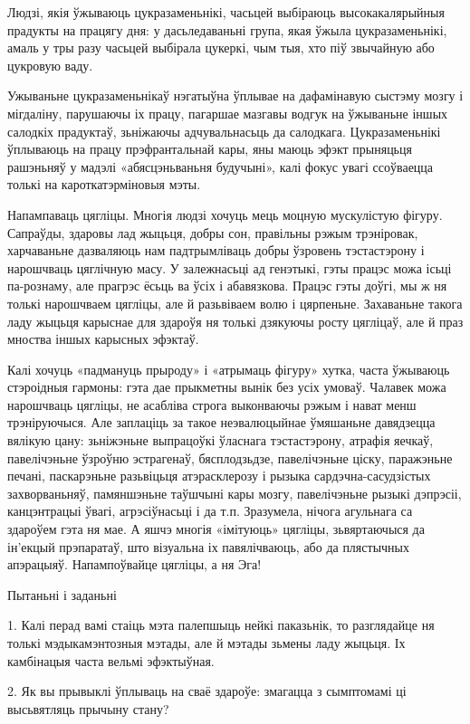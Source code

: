 Людзі, якія ўжываюць цукразаменьнікі, часьцей выбіраюць высокакалярыйныя прадукты на працягу дня: у дасьледаваньні група, якая ўжыла цукразаменьнікі, амаль у тры разу часьцей выбірала цукеркі, чым тыя, хто піў звычайную або цукровую ваду.

Ужываньне цукразаменьнікаў нэгатыўна ўплывае на дафамінавую сыстэму мозгу і мігдаліну, парушаючы іх працу, пагаршае мазгавы водгук на ўжываньне іншых салодкіх прадуктаў, зьніжаючы адчувальнасьць да салодкага. Цукразаменьнікі ўплываюць на працу прэфрантальнай кары, яны маюць эфэкт прыняцьця рашэньняў у мадэлі «абясцэньваньня будучыні», калі фокус увагі ссоўваецца толькі на кароткатэрміновыя мэты.

Напампаваць цягліцы. Многія людзі хочуць мець моцную мускулістую фігуру. Сапраўды, здаровы лад жыцьця, добры сон, правільны рэжым трэніровак, харчаваньне дазваляюць нам падтрымліваць добры ўзровень тэстастэрону і нарошчваць цяглічную масу. У залежнасьці ад генэтыкі, гэты працэс можа ісьці па-рознаму, але прагрэс ёсьць ва ўсіх і абавязкова. Працэс гэты доўгі, мы ж ня толькі нарошчваем цягліцы, але й разьвіваем волю і цярпеньне. Захаваньне такога ладу жыцьця карыснае для здароўя ня толькі дзякуючы росту цягліцаў, але й праз мноства іншых карысных эфэктаў.

Калі хочуць «падмануць прыроду» і «атрымаць фігуру» хутка, часта ўжываюць стэроідныя гармоны: гэта дае прыкметны вынік без усіх умоваў. Чалавек можа нарошчваць цягліцы, не асабліва строга выконваючы рэжым і нават менш трэніруючыся. Але заплаціць за такое неэвалюцыйнае ўмяшаньне давядзецца вялікую цану: зьніжэньне выпрацоўкі ўласнага тэстастэрону, атрафія яечкаў, павелічэньне ўзроўню эстрагенаў, бясплодзьдзе, павелічэньне ціску, паражэньне печані, паскарэньне разьвіцьця атэрасклерозу і рызыка сардэчна-сасудзістых захворваньняў, памяншэньне таўшчыні кары мозгу, павелічэньне рызыкі дэпрэсіі, канцэнтрацыі ўвагі, агрэсіўнасьці і да т.п. Зразумела, нічога агульнага са здароўем гэта ня мае. А яшчэ многія «імітуюць» цягліцы, зьвяртаючыся да ін'екцый прэпаратаў, што візуальна іх павялічваюць, або да плястычных апэрацыяў. Напампоўвайце цягліцы, а ня Эга!

Пытаньні і заданьні

1. Калі перад вамі стаіць мэта палепшыць нейкі паказьнік, то разглядайце ня толькі мэдыкамэнтозныя мэтады, але й мэтады зьмены ладу жыцьця. Іх камбінацыя часта вельмі эфэктыўная.

2. Як вы прывыклі ўплываць на сваё здароўе: змагацца з сымптомамі ці высьвятляць прычыну стану?

